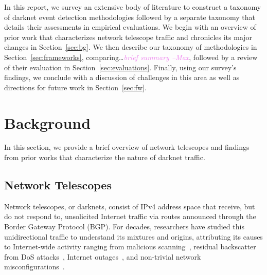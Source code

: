 \documentclass[manuscript,nonacm]{acmart}
\newcommand{\maxnote}[1]{\textit{\textcolor{violet}{#1 --Max}}}
\begin{document}


In this report, we survey an extensive body of literature to construct a taxonomy of darknet event detection methodologies followed by a separate taxonomy that details their assessments in empirical evaluations. 
We begin with an overview of prior work that characterizes network telescope traffic and chronicles its major changes in Section~\ref{sec:bg}.
We then describe our taxonomy of methodologies in Section~\ref{sec:frameworks}, comparing\dots\maxnote{brief summary}, followed by a review of their evaluation in Section~\ref{sec:evaluations}.
Finally, using our survey's findings, we conclude with a discussion of challenges in this area as well as directions for future work in Section~\ref{sec:fw}.


\label{sec:bg}
\section{Background}

In this section, we provide a brief overview of network telescopes and findings from prior works that characterize the nature of darknet traffic.

\label{sec:bg:nt}
\subsection{Network Telescopes}

Network telescopes, or darknets, consist of IPv4 address space that receive, but do not respond to, unsolicited Internet traffic via routes announced through the Border Gateway Protocol (BGP).
For decades, researchers have studied this unidirectional traffic to understand its mixtures and origins, attributing its causes to Internet-wide activity ranging from 
malicious scanning~\cite{@@}, residual backscatter from DoS attacks~\cite{@@}, Internet outages~\cite{2011dainotti,2013benson,2015benson,2012dainotti,2021padmanabhan}, and non-trivial network misconfigurations~\cite{@@}.
\end{document}
